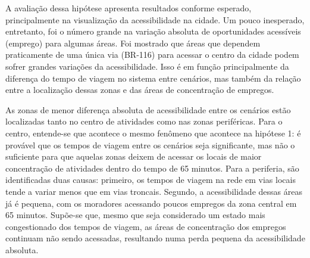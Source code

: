 \documentclass[        
    a4paper,          %
    12pt,             %
    chapter=TITLE,    %
    section=Title,    %
    subsection=Title, %
    oneside,          %
    english,          %
    spanish,          %
    brazil,           %
    fleqn             %
]{abntex2}
\begin{document}
  \begin{figure}[!h]
  \captionsetup{width=16cm}
  \centering
  \end{figure}
  
  A avaliação dessa hipótese apresenta resultados conforme esperado, principalmente na visualização da acessibilidade na cidade. Um pouco inesperado, entretanto, foi o número grande na variação absoluta de oportunidades acessíveis (emprego) para algumas áreas. Foi mostrado que áreas que dependem praticamente de uma única via (BR-116) para acessar o centro da cidade podem sofrer grandes variações da acessibilidade. Isso é em função principalmente da diferença do tempo de viagem no sistema entre cenários, mas também da relação entre a localização dessas zonas e das áreas de concentração de empregos.
  
  As zonas de menor diferença absoluta de acessibilidade entre os cenários estão localizadas tanto no centro de atividades como nas zonas periféricas. Para o centro, entende-se que acontece o mesmo fenômeno que acontece na hipótese 1: é provável que os tempos de viagem entre os cenários seja significante, mas não o suficiente para que aquelas zonas deixem de acessar os locais de maior concentração de atividades dentro do tempo de 65 minutos. Para a periferia, são identificadas duas causas: primeiro, os tempos de viagem na rede em vias locais tende a variar menos que em vias troncais. Segundo, a acessibilidade dessas áreas já é pequena, com os moradores acessando poucos empregos da zona central em 65 minutos. Supõe-se que, mesmo que seja considerado um estado mais congestionado dos tempos de viagem, as áreas de concentração dos empregos continuam não sendo acessadas, resultando numa perda pequena da acessibilidade absoluta.
  
\end{document}
